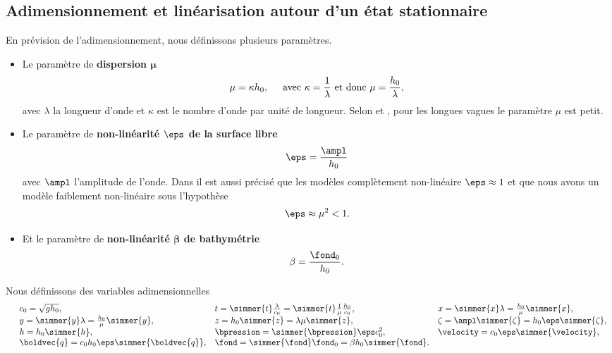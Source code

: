 \subsection{Adimensionnement et linéarisation autour d'un état stationnaire}
\noindent En prévision de l'adimensionnement, nous définissons plusieurs paramètres.
\begin{itemize}[label=$\mybullet$]
\item Le paramètre de \textbf{dispersion $\boldsymbol{\mu}$}
	\begin{equation}
		\mu = \kappa h_0,\hspace{5mm}\text{avec }\kappa = \frac{1}{\lambda} \text{ et donc } \mu = \frac{h_0}{\lambda},
	\end{equation}
	avec $\lambda$ la longueur d'onde et $\kappa$ est le nombre d'onde par unité de longueur. Selon \citet{bosi_spectral_2019} et \citet{Pons2018}, pour les longues vagues le paramètre $\mu$ est petit.\\
\item Le paramètre de \textbf{non-linéarité $\boldsymbol{\eps}$ de la surface libre}
	\begin{equation}
		\eps = \frac{\ampl}{h_0}
	\end{equation}
	avec $\ampl$ l'amplitude de l'onde. Dans \citet{bosi_spectral_2019} il est aussi précisé que les modèles complètement non-linéaire $\eps \approx 1$ et que nous avons un modèle faiblement non-linéaire sous l'hypothèse
	\begin{equation}
		\eps \approx \mu^2 < 1.
	\end{equation}
\item Et le paramètre de \textbf{non-linéarité $\boldsymbol{\beta}$ de bathymétrie}
	\begin{equation}
		\beta = \frac{\fond_0}{h_0}.
	\end{equation}
\end{itemize}
Nous définissons des variables adimensionnelles 
\begin{equation}
\begin{array}{llll}
	& c_0 = \sqrt{gh_0}, \hspace{3cm}
	& t= \simmer{t}\frac{\lambda}{c_0}=\simmer{t}\frac{1}{\mu}\frac{h_0}{c_0},\hspace{2cm}
	& x = \simmer{x}\lambda = \frac{h_0}{\mu}\simmer{x},\\
	& y = \simmer{y}\lambda = \frac{h_0}{\mu}\simmer{y},
	& z= h_0\simmer{z}= \lambda \mu \simmer{z},
	& \zeta = \ampl \simmer{\zeta} = h_0 \eps \simmer{\zeta},\\
	& h = h_0 \simmer{h},
	& \bpression = \simmer{\bpression}\eps c_0^2,
	& \velocity = c_0\eps\simmer{\velocity}, \\
	& \boldvec{q} = c_0h_0\eps\simmer{\boldvec{q}},
	& \fond = \simmer{\fond}\fond_0 = \beta h_0\simmer{\fond}.
\end{array}\label{eq:advariable}
\end{equation}
